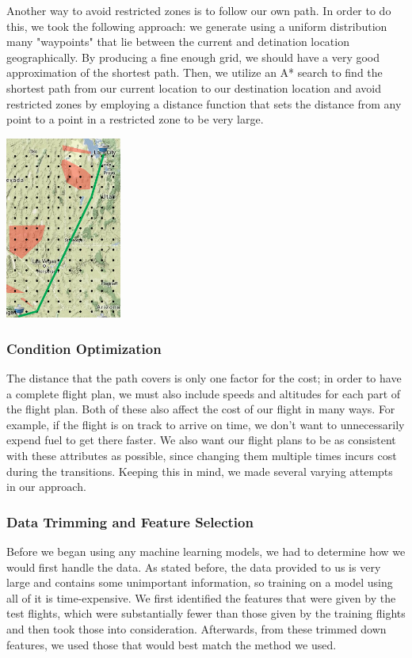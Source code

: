 \documentclass{article}[12pt]
\begin{document}
\begin{multicols}{2}
Another way to avoid restricted zones is to follow our own path. In order to do this, we took the following approach: we generate using a uniform distribution many "waypoints" that lie between the current and detination location geographically. By producing a fine enough grid, we should have a very good approximation of the shortest path. Then, we utilize an A* search to find the shortest path from our current location to our destination location and avoid restricted zones by employing a distance function that sets the distance from any point to a point in a restricted zone to be very large.
\begingroup
  \begin{center}
    \includegraphics[width=1.5in]{astar.png}
	\end{center}
\endgroup

\subsubsection{Condition Optimization}
The distance that the path covers is only one factor for the cost; in order to have a complete flight plan, we must also include speeds and altitudes for each part of the flight plan. Both of these also affect the cost of our flight in many ways. For example, if the flight is on track to arrive on time, we don't want to unnecessarily expend fuel to get there faster. We also want our flight plans to be as consistent with these attributes as possible, since changing them multiple times incurs cost during the transitions. Keeping this in mind, we made several varying attempts in our approach. 

\subsubsection{Data Trimming and Feature Selection}

Before we began using any machine learning models, we had to determine how we would first handle the data. As stated before, the data provided to us is very large and contains some unimportant information, so training on a model using all of it is time-expensive. We first identified the features that were given by the test flights, which were substantially fewer than those given by the training flights and then took those into consideration. Afterwards, from these trimmed down features, we used those that would best match the method we used. 



\end{multicols}
\end{document}
